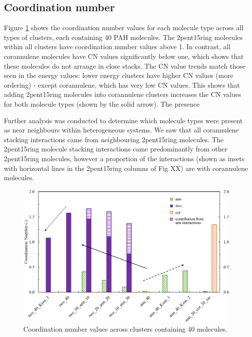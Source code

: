 \subsection{Coordination number}
Figure \ref{fig:coordination_numbers} shows the coordination number values for each molecule type across all types of clusters, each containing 40 PAH molecules.  
The 2pent15ring molecules within all clusters have coordination number values above 1. In contrast, all corannulene molecules have CN values significantly below one, which shows that these molecules do not arrange in close stacks.  The CN value trends match those seen in the energy values: lower energy clusters have higher CN values (more ordering) - except corannulene, which has very low CN values.  
This shows that adding 2pent15ring molecules into corannulene clusters increases the CN values for both molecule types (shown by the solid arrow).
The presence 

Further analysis was conducted to determine which molecule types were present as near neighbours within heterogeneous systems.  We saw that all corannulene stacking interactions came from neighbouring 2pent15ring molecules.  The 2pent15ring molecule stacking interactions came predominantly from other 2pent15ring molecules, however a proportion of the interactions (shown as insets with horizontal lines in the 2pent15ring columns of Fig XX) are with corannulene molecules.



%
\begin{figure}[!tbh]
\centering
\includegraphics[width=0.8\linewidth]{Figures/CN_bar_chart.eps}
\caption{Coordination number values across clusters containing 40 molecules.}
\label{fig:coordination_numbers}
\end{figure}
%

